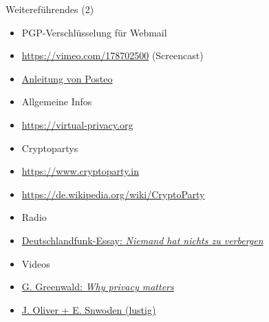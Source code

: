 \documentclass{beamer}
\begin{document}
\begin{frame}{Weitereführendes (2)}

\begin{itemize}
\item[] \hspace{-2em} PGP-Verschlüsselung für Webmail
  \item \url{https://vimeo.com/178702500} (Screencast)\\[2mm]
  \item \href{https://posteo.de/hilfe/wie-installiere-ich-eine-ende-zu-ende-verschluesselung-pgp-im-browser}{Anleitung von Posteo}
  \item[] \hspace{-2em} Allgemeine Infos
  \item \url{https://virtual-privacy.org}
  \item[] \hspace{-2em} Cryptopartys
  \item \url{https://www.cryptoparty.in}
  \item \url{https://de.wikipedia.org/wiki/CryptoParty}
  \item[] \hspace{-2em} Radio
  \item \href{http://www.deutschlandfunk.de/ein-essay-ueber-geheimnisse-niemand-hat-nichts-zu-verbergen.1184.de.html?dram:article_id=395252}{Deutschlandfunk-Essay: \textit{Niemand hat nichts zu verbergen}}
  \item[] \hspace{-2em} Videos
  \item \href{https://www.ted.com/talks/glenn_greenwald_why_privacy_matters}{G. Greenwald: \textit{Why privacy matters}}
  \item \href{https://www.youtube.com/watch?v=XEVlyP4_11M}{J. Oliver + E. Snwoden (lustig)}
\end{itemize}
\end{frame}
\end{document}

